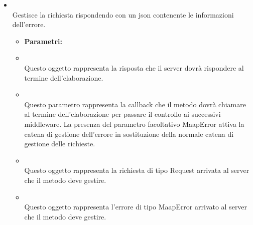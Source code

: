 \begin{itemize}
\item[] \textbf{} \\ Gestisce la richiesta rispondendo con un json contenente le informazioni dell'errore.
\begin{itemize}\addtolength{\itemsep}{-0.5\baselineskip}
\item[] \textbf{Parametri:}
\item[]  \\ Questo oggetto rappresenta la risposta che il server dovrà rispondere al termine dell'elaborazione.
\item[]  \\ Questo parametro rappresenta la callback che il metodo dovrà chiamare al termine dell'elaborazione per passare il controllo ai successivi middleware. La presenza del parametro facoltativo MaapError attiva la catena di gestione dell'errore in sostituzione della normale catena di gestione delle richieste.
\item[]  \\ Questo oggetto rappresenta la richiesta di tipo Request arrivata al server che il metodo deve gestire.
\item[]  \\ Questo oggetto rappresenta l'errore di tipo MaapError arrivato al server che il metodo deve gestire.
\end{itemize}
\end{itemize}

